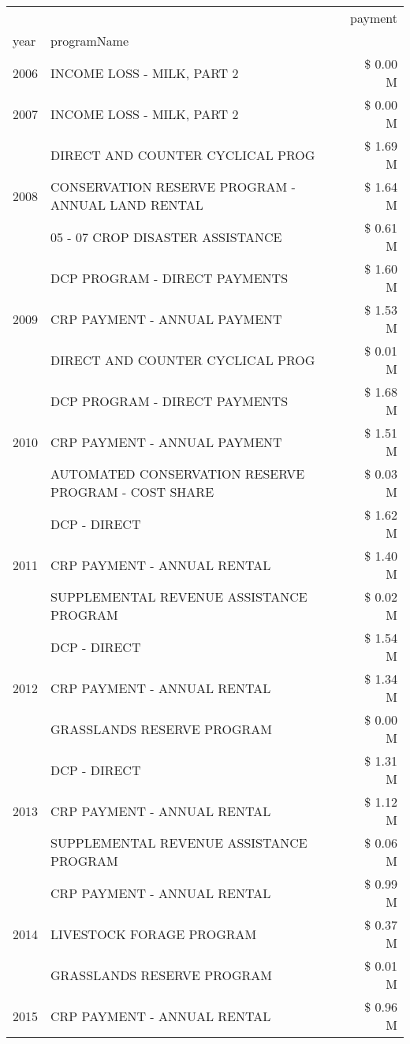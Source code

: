 \begin{tabular}{llr}
\toprule
 &  & payment \\
year & programName &  \\
\midrule
2006 & INCOME LOSS - MILK, PART 2 & \$ 0.00 M \\
\cline{1-3}
2007 & INCOME LOSS - MILK, PART 2 & \$ 0.00 M \\
\cline{1-3}
\multirow[t]{3}{*}{2008} & DIRECT AND COUNTER CYCLICAL PROG & \$ 1.69 M \\
 & CONSERVATION RESERVE PROGRAM - ANNUAL LAND RENTAL & \$ 1.64 M \\
 & 05 - 07 CROP DISASTER ASSISTANCE & \$ 0.61 M \\
\cline{1-3}
\multirow[t]{3}{*}{2009} & DCP PROGRAM - DIRECT PAYMENTS & \$ 1.60 M \\
 & CRP PAYMENT - ANNUAL PAYMENT & \$ 1.53 M \\
 & DIRECT AND COUNTER CYCLICAL PROG & \$ 0.01 M \\
\cline{1-3}
\multirow[t]{3}{*}{2010} & DCP PROGRAM - DIRECT PAYMENTS & \$ 1.68 M \\
 & CRP PAYMENT - ANNUAL PAYMENT & \$ 1.51 M \\
 & AUTOMATED CONSERVATION RESERVE PROGRAM - COST SHARE & \$ 0.03 M \\
\cline{1-3}
\multirow[t]{3}{*}{2011} & DCP - DIRECT & \$ 1.62 M \\
 & CRP PAYMENT - ANNUAL RENTAL & \$ 1.40 M \\
 & SUPPLEMENTAL REVENUE ASSISTANCE PROGRAM & \$ 0.02 M \\
\cline{1-3}
\multirow[t]{3}{*}{2012} & DCP - DIRECT & \$ 1.54 M \\
 & CRP PAYMENT - ANNUAL RENTAL & \$ 1.34 M \\
 & GRASSLANDS RESERVE PROGRAM & \$ 0.00 M \\
\cline{1-3}
\multirow[t]{3}{*}{2013} & DCP - DIRECT & \$ 1.31 M \\
 & CRP PAYMENT - ANNUAL RENTAL & \$ 1.12 M \\
 & SUPPLEMENTAL REVENUE ASSISTANCE PROGRAM & \$ 0.06 M \\
\cline{1-3}
\multirow[t]{3}{*}{2014} & CRP PAYMENT - ANNUAL RENTAL & \$ 0.99 M \\
 & LIVESTOCK FORAGE PROGRAM & \$ 0.37 M \\
 & GRASSLANDS RESERVE PROGRAM & \$ 0.01 M \\
\cline{1-3}
\multirow[t]{3}{*}{2015} & CRP PAYMENT - ANNUAL RENTAL & \$ 0.96 M \\

\end{tabular}
